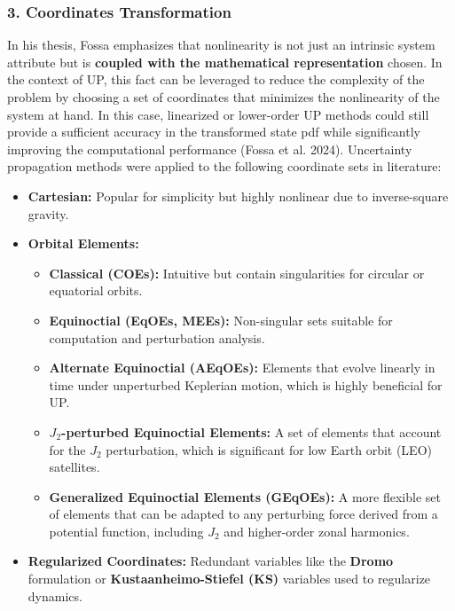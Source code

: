 \documentclass[
  letterpaper,
  DIV=11,
  numbers=noendperiod,
  oneside]{scrartcl}
\begin{document}
\subsubsection{3. Coordinates
Transformation}\label{coordinates-transformation}

In his thesis, Fossa emphasizes that nonlinearity is not just an
intrinsic system attribute but is \textbf{coupled with the mathematical
representation} chosen. In the context of UP, this fact can be leveraged
to reduce the complexity of the problem by choosing a set of coordinates
that minimizes the nonlinearity of the system at hand. In this case,
linearized or lower-order UP methods could still provide a sufficient
accuracy in the transformed state pdf while significantly improving the
computational performance (Fossa et al. 2024). Uncertainty propagation
methods were applied to the following coordinate sets in literature:

\begin{itemize}
\item
  \textbf{Cartesian:} Popular for simplicity but highly nonlinear due to
  inverse-square gravity.
\item
  \textbf{Orbital Elements:}

  \begin{itemize}
  \item
    \textbf{Classical (COEs):} Intuitive but contain singularities for
    circular or equatorial orbits.
  \item
    \textbf{Equinoctial (EqOEs, MEEs):} Non-singular sets suitable for
    computation and perturbation analysis.
  \item
    \textbf{Alternate Equinoctial (AEqOEs):} Elements that evolve
    linearly in time under unperturbed Keplerian motion, which is highly
    beneficial for UP.
  \item
    \textbf{\(J_2\)-perturbed Equinoctial Elements:} A set of elements
    that account for the \(J_2\) perturbation, which is significant for
    low Earth orbit (LEO) satellites.
  \item
    \textbf{Generalized Equinoctial Elements (GEqOEs):} A more flexible
    set of elements that can be adapted to any perturbing force derived
    from a potential function, including \(J_2\) and higher-order zonal
    harmonics.
  \end{itemize}
\item
  \textbf{Regularized Coordinates:} Redundant variables like the
  \textbf{Dromo} formulation or \textbf{Kustaanheimo-Stiefel (KS)}
  variables used to regularize dynamics.
\end{itemize}
\end{document}
